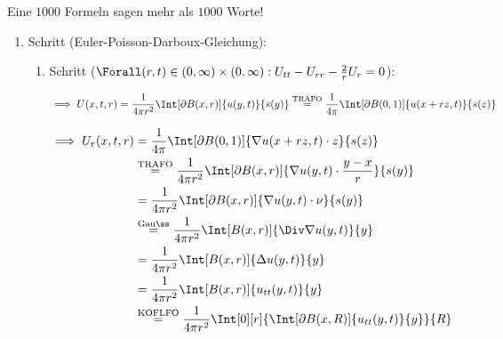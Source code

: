 \begin{solution}

Eine $1000$ Formeln sagen mehr als $1000$ Worte!

\begin{enumerate}[label = \arabic*.]

    \item Schritt (Euler-Poisson-Darboux-Gleichung):

    \begin{enumerate}[label = 1.\arabic*.]

        \item Schritt ($\Forall (r, t) \in (0, \infty) \times (0, \infty): U_{tt} - U_{rr} - \frac{2}{r} U_r = 0$):

        \begin{align*}
            \implies
            U(x, t, r)
            =
            \frac{1}{4 \pi r^2}
            \Int[\partial B(x, r)]{u(y, t)}{s(y)}
            \stackrel
            {
                \mathrm{TRAFO}
            }{=}
            \frac{1}{4 \pi}
            \Int[\partial B(0, 1)]{u(x + r z, t)}{s(z)}
        \end{align*}

        \begin{align*}
            \implies
            U_r(x, t, r)
            & =
            \frac{1}{4 \pi}
            \Int[\partial B(0, 1)]{\nabla u(x + r z, t) \cdot z}{s(z)} \\
            & \stackrel
            {
                \mathrm{TRAFO}
            }{=}
            \frac{1}{4 \pi r^2}
            \Int[\partial B(x, r)]{\nabla u(y, t) \cdot \frac{y - x}{r}}{s(y)} \\
            & =
            \frac{1}{4 \pi r^2}
            \Int[\partial B(x, r)]{\nabla u(y, t) \cdot \nu}{s(y)} \\
            & \stackrel
            {
                \mathrm{Gauß}
            }{=}
            \frac{1}{4 \pi r^2}
            \Int[B(x, r)]{\Div \nabla u(y, t)}{y} \\
            & =
            \frac{1}{4 \pi r^2}
            \Int[B(x, r)]{\Delta u(y, t)}{y} \\
            & =
            \frac{1}{4 \pi r^2}
            \Int[B(x, r)]{u_{tt}(y, t)}{y} \\
            & \stackrel
            {
                \mathrm{KOFLFO}
            }{=}
            \frac{1}{4 \pi r^2}
            \Int[0][r]
            {
                \Int[\partial B(x, R)]{u_{tt}(y, t)}{y}
            }{R}
        \end{align*}


\end{enumerate}
\end{enumerate}
\end{solution}
